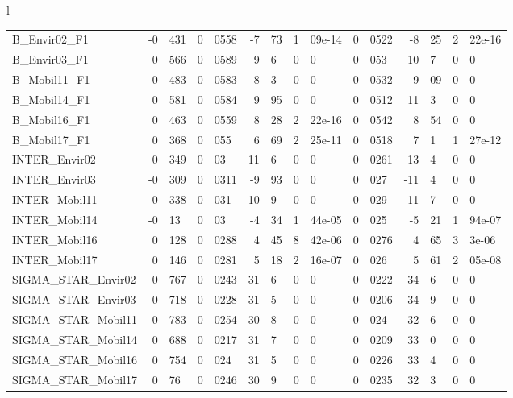 \documentclass[12pt,a4paper]{article}
\begin{document}
\begin{sidewaystable}[htb]
\begin{tabular}{l}
\begin{tabular}{lr@{.}lr@{.}lr@{.}lr@{.}lr@{.}lr@{.}lr@{.}l}
B\_Envir02\_F1               &  -0&431 &   0&0558 &   -7&73 & 1&09e-14 &        0&0522 &        -8&25 &      2&22e-16 \\
B\_Envir03\_F1               &   0&566 &   0&0589 &     9&6 &      0&0 &         0&053 &         10&7 &           0&0 \\
B\_Mobil11\_F1               &   0&483 &   0&0583 &     8&3 &      0&0 &        0&0532 &         9&09 &           0&0 \\
B\_Mobil14\_F1               &   0&581 &   0&0584 &    9&95 &      0&0 &        0&0512 &         11&3 &           0&0 \\
B\_Mobil16\_F1               &   0&463 &   0&0559 &    8&28 & 2&22e-16 &        0&0542 &         8&54 &           0&0 \\
B\_Mobil17\_F1               &   0&368 &    0&055 &    6&69 & 2&25e-11 &        0&0518 &          7&1 &      1&27e-12 \\
INTER\_Envir02              &   0&349 &     0&03 &    11&6 &      0&0 &        0&0261 &         13&4 &           0&0 \\
INTER\_Envir03              &  -0&309 &   0&0311 &   -9&93 &      0&0 &         0&027 &        -11&4 &           0&0 \\
INTER\_Mobil11              &   0&338 &    0&031 &    10&9 &      0&0 &         0&029 &         11&7 &           0&0 \\
INTER\_Mobil14              &   -0&13 &     0&03 &   -4&34 & 1&44e-05 &         0&025 &        -5&21 &      1&94e-07 \\
INTER\_Mobil16              &   0&128 &   0&0288 &    4&45 & 8&42e-06 &        0&0276 &         4&65 &       3&3e-06 \\
INTER\_Mobil17              &   0&146 &   0&0281 &    5&18 & 2&16e-07 &         0&026 &         5&61 &      2&05e-08 \\
SIGMA\_STAR\_Envir02         &   0&767 &   0&0243 &    31&6 &      0&0 &        0&0222 &         34&6 &           0&0 \\
SIGMA\_STAR\_Envir03         &   0&718 &   0&0228 &    31&5 &      0&0 &        0&0206 &         34&9 &           0&0 \\
SIGMA\_STAR\_Mobil11         &   0&783 &   0&0254 &    30&8 &      0&0 &         0&024 &         32&6 &           0&0 \\
SIGMA\_STAR\_Mobil14         &   0&688 &   0&0217 &    31&7 &      0&0 &        0&0209 &         33&0 &           0&0 \\
SIGMA\_STAR\_Mobil16         &   0&754 &    0&024 &    31&5 &      0&0 &        0&0226 &         33&4 &           0&0 \\
SIGMA\_STAR\_Mobil17         &    0&76 &   0&0246 &    30&9 &      0&0 &        0&0235 &         32&3 &           0&0 \\
\hline
\end{tabular}
  \end{tabular}
\end{sidewaystable}
\end{document}
